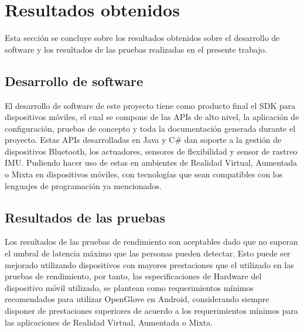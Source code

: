 \section{Resultados obtenidos}
Esta sección se concluye sobre los resultados obtenidos sobre el desarrollo de software y los resultados de las pruebas realizadas en el presente trabajo.

\subsection{Desarrollo de software}
El desarrollo de software de este proyecto tiene como producto final el SDK para dispositivos móviles, el cual se compone de las APIs de alto nivel, la aplicación de configuración, pruebas de concepto y toda la documentación generada durante el proyecto. Estas APIs desarrolladas en Java y C\# dan soporte a la gestión de dispositivos Bluetooth, los actuadores, sensores de flexibilidad  y sensor de rastreo IMU. Pudiendo hacer uso de estas en ambientes de Realidad Virtual, Aumentada o Mixta en dispositivos móviles, con tecnologías que sean compatibles con los lenguajes de programación ya mencionados.

\subsection{Resultados de las pruebas}
	
	Los resultados de las pruebas de rendimiento son aceptables dado que no superan el umbral de latencia máximo que las personas pueden detectar. Esto puede ser mejorado utilizando dispositivos con mayores prestaciones que el utilizado en las pruebas de rendimiento, por tanto, las especificaciones de Hardware del dispositivo móvil utilizado, se plantean como requerimientos mínimos recomendados para utilizar OpenGlove en Android, considerando siempre disponer de prestaciones superiores de acuerdo a los requerimientos mínimos para las aplicaciones de Realidad Virtual, Aumentada o Mixta.
